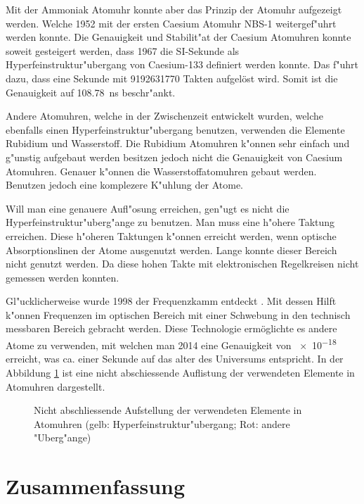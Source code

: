 \begin{refsection}
Mit der Ammoniak Atomuhr konnte aber das Prinzip der Atomuhr
aufgezeigt werden.  Welche 1952 mit der ersten Caesium Atomuhr NBS-1
weitergef"uhrt werden konnte.  Die Genauigkeit und Stabilit"at der
Caesium Atomuhren konnte soweit gesteigert werden, dass 1967 die
SI-Sekunde als Hyperfeinstruktur"ubergang von Caesium-133 definiert
werden konnte.  Das f"uhrt dazu, dass eine Sekunde mit
\num{9192631770} Takten aufgelöst wird.  Somit ist die Genauigkeit auf
\SI{108.78}{\nano\second} beschr"ankt.

Andere Atomuhren, welche in der Zwischenzeit entwickelt wurden,
welche ebenfalls einen Hyperfeinstruktur"ubergang benutzen, verwenden
die Elemente Rubidium und Wasserstoff.  Die Rubidium Atomuhren k"onnen
sehr einfach und g"unstig aufgebaut werden besitzen jedoch nicht die
Genauigkeit von Caesium Atomuhren.  Genauer k"onnen die
Wasserstoffatomuhren gebaut werden.  Benutzen jedoch eine komplezere
K"uhlung der Atome.

Will man eine genauere Aufl"osung erreichen, gen"ugt es nicht die
Hyperfeinstruktur"uberg"ange zu benutzen.  Man muss eine h"ohere
Taktung erreichen.  Diese h"oheren Taktungen k"onnen erreicht werden,
wenn optische Absorptionslinen der Atome ausgenutzt werden.  Lange
konnte dieser Bereich nicht genutzt werden.  Da diese hohen Takte
mit elektronischen Regelkreisen nicht gemessen werden konnten.

Gl"ucklicherweise wurde 1998 der Frequenzkamm entdeckt
\cite{SdW:kamm}.  Mit dessen Hilft k"onnen Frequenzen im optischen
Bereich mit einer Schwebung in den technisch messbaren Bereich
gebracht werden.  Diese Technologie ermöglichte es andere Atome zu
verwenden, mit welchen man 2014 eine Genauigkeit von \num{e-18}
erreicht, was ca. einer Sekunde auf das alter des Universums
entspricht.  In der Abbildung \ref{fig:periode} ist eine nicht
abschiessende Auflistung der verwendeten Elemente in Atomuhren
dargestellt.

\begin{figure}
  \centering
  
  \caption{Nicht abschliessende Aufstellung der verwendeten Elemente
    in Atomuhren (gelb: Hyperfeinstruktur"ubergang; Rot: andere
    "Uberg"ange)}
  \label{fig:periode}
\end{figure}

\section{Zusammenfassung}

\printbibliography[heading=subbibliography]
\end{refsection}

